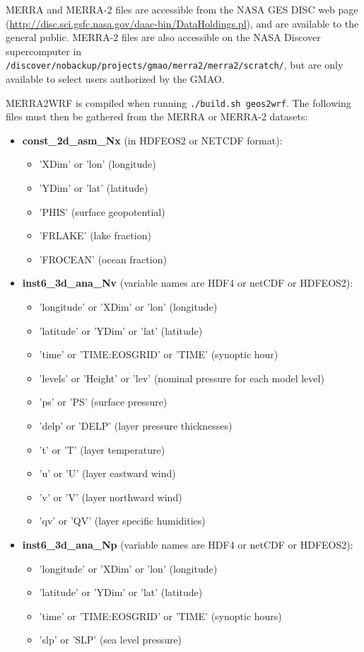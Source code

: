 MERRA and MERRA-2 files are accessible from the NASA GES DISC web page
(\url{http://disc.sci.gsfc.nasa.gov/daac-bin/DataHoldings.pl}), and are 
available to the general public. MERRA-2 files are also accessible on the NASA
Discover supercomputer in\\
\texttt{/discover/nobackup/projects/gmao/merra2/merra2/scratch/}, but are only
available to select users authorized by the GMAO.

MERRA2WRF is compiled when running \texttt{./build.sh geos2wrf}. The following
files must then be gathered from the MERRA or MERRA-2 datasets:

\begin{itemize}
\item \textbf{const\_2d\_asm\_Nx} (in HDFEOS2 or NETCDF format):
  \begin{itemize}
  \item 'XDim'  or 'lon' (longitude)
  \item 'YDim' or 'lat' (latitude)
  \item 'PHIS' (surface geopotential)
  \item 'FRLAKE' (lake fraction)
  \item 'FROCEAN' (ocean fraction)
  \end{itemize}

\item \textbf{inst6\_3d\_ana\_Nv} (variable names are HDF4 or netCDF or 
HDFEOS2):
  \begin{itemize}
  \item 'longitude' or 'XDim'  or 'lon' (longitude)
  \item 'latitude' or 'YDim' or 'lat' (latitude)
  \item 'time' or 'TIME:EOSGRID' or 'TIME' (synoptic hour)
  \item 'levels' or 'Height' or 'lev' (nominal pressure for each model level)
  \item 'ps' or 'PS' (surface pressure)
  \item 'delp' or 'DELP' (layer pressure thicknesses)
  \item 't' or 'T' (layer temperature)
  \item 'u' or 'U' (layer eastward wind)
  \item 'v' or 'V' (layer northward wind)
  \item 'qv' or 'QV' (layer specific humidities)
  \end{itemize}

\item \textbf{inst6\_3d\_ana\_Np} (variable names are HDF4 or netCDF or 
HDFEOS2):
  \begin{itemize}
  \item 'longitude' or 'XDim' or 'lon' (longitude)
  \item 'latitude' or 'YDim' or 'lat' (latitude)
  \item 'time' or 'TIME:EOSGRID' or 'TIME' (synoptic hours)
  \item 'slp' or 'SLP' (sea level pressure)
  \end{itemize}


\end{itemize}
